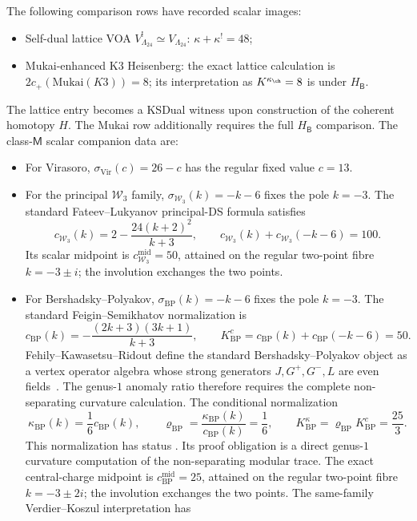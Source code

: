 \begin{remark}
The following comparison rows have recorded scalar images:
\begin{itemize}
\item Self-dual lattice VOA $V_{\Lambda_{24}}^!\simeq V_{\Lambda_{24}}$:
$\kappa+\kappa^!=48$;
\item Mukai-enhanced K3 Heisenberg: the exact lattice calculation is
$2c_+(\mathrm{Mukai}(K3))=8$; its interpretation as
$K^{\kappa_{\ch}}=8$ is \ClaimStatusConjectured{} under
$H_{\mathsf B}$.
\end{itemize}
The lattice entry becomes a KSDual witness upon construction of the
coherent homotopy $H$.  The Mukai row additionally requires the full
$H_{\mathsf B}$ comparison.  The class-$\mathsf M$ scalar companion
data are:
\begin{itemize}
\item For Virasoro, $\sigma_{\mathrm{Vir}}(c)=26-c$ has the regular
fixed value $c=13$.
\item For the principal $\mathcal W_3$ family,
$\sigma_{\mathcal W_3}(k)=-k-6$ fixes the pole $k=-3$.  The standard
Fateev--Lukyanov principal-DS formula satisfies
\[
 c_{\mathcal W_3}(k)
 =2-\frac{24(k+2)^2}{k+3},
 \qquad
 c_{\mathcal W_3}(k)+c_{\mathcal W_3}(-k-6)=100.
\]
Its scalar midpoint is $c^{\mathrm{mid}}_{\mathcal W_3}=50$, attained
on the regular two-point fibre $k=-3\pm i$; the involution exchanges
the two points.
\item For Bershadsky--Polyakov,
$\sigma_{\mathrm{BP}}(k)=-k-6$ fixes the pole $k=-3$.  The standard
Feigin--Semikhatov normalization is
\[
 c_{\mathrm{BP}}(k)
 =-\frac{(2k+3)(3k+1)}{k+3},
 \qquad
 K^c_{\mathrm{BP}}
 =c_{\mathrm{BP}}(k)+c_{\mathrm{BP}}(-k-6)=50.
\]
Fehily--Kawasetsu--Ridout define the standard Bershadsky--Polyakov
object as a vertex operator algebra whose strong generators
$J,G^+,G^-,L$ are even fields~\cite[\S2.1]{FKR20}.  The genus-$1$
anomaly ratio therefore requires the complete non-separating curvature
calculation.  The conditional normalization
\[
 \kappa_{\mathrm{BP}}(k)=\frac16c_{\mathrm{BP}}(k),
 \qquad
 \varrho_{\mathrm{BP}}
 =\frac{\kappa_{\mathrm{BP}}(k)}{c_{\mathrm{BP}}(k)}=\frac16,
 \qquad
 K^\kappa_{\mathrm{BP}}
 =\varrho_{\mathrm{BP}}K^c_{\mathrm{BP}}=\frac{25}{3}.
\]
This normalization has status \ClaimStatusOpen.  Its proof
obligation is a direct
genus-$1$ curvature computation of the non-separating modular trace.
The exact central-charge midpoint is
$c^{\mathrm{mid}}_{\mathrm{BP}}=25$, attained
on the regular two-point fibre $k=-3\pm2i$; the involution exchanges
the two points.  The same-family Verdier--Koszul interpretation has

\end{itemize}
\end{remark}
